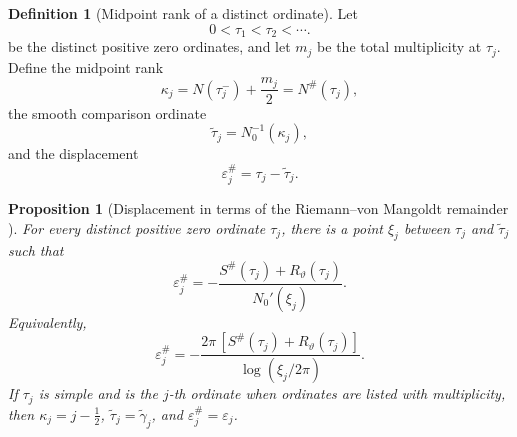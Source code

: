 \documentclass[11pt]{amsart}
\numberwithin{equation}{section}
\theoremstyle{plain}
\newtheorem{proposition}[theorem]{Proposition}
\theoremstyle{definition}
\newtheorem{definition}[theorem]{Definition}
\theoremstyle{remark}
\newcommand{\1}{\mathbf{1}}
\begin{document}
\begin{definition}[Midpoint rank of a distinct ordinate]
\label{def:midpoint_rank_distinct_ordinate}
Let
\begin{equation}
0<\tau_1<\tau_2<\cdots.
\label{eq:distinct_ordinate_order}
\end{equation}
be the distinct positive zero ordinates, and let \(m_j\) be the total
multiplicity at \(\tau_j\).  Define the midpoint rank
\begin{equation}
\kappa_j
=
N(\tau_j^-)+\frac{m_j}{2}
=
N^{\#}(\tau_j),
\label{eq:midpoint_rank_distinct_ordinate}
\end{equation}
the smooth comparison ordinate
\begin{equation}
\widetilde\tau_j
=
N_0^{-1}(\kappa_j),
\label{eq:smooth_distinct_ordinate}
\end{equation}
and the displacement
\begin{equation}
\varepsilon_j^{\#}
=
\tau_j-\widetilde\tau_j.
\label{eq:distinct_ordinate_displacement}
\end{equation}
\end{definition}


\begin{proposition}[Displacement in terms of the Riemann--von Mangoldt remainder {}]
\label{prop:displacement_rvm_remainder}
For every distinct positive zero ordinate \(\tau_j\), there is a point
\(\xi_j\) between \(\tau_j\) and \(\widetilde\tau_j\) such that
\begin{equation}
\boxed{
\varepsilon_j^{\#}
=
-
\frac{S^{\#}(\tau_j)+R_\vartheta(\tau_j)}
{N_0'(\xi_j)}.
}
\label{eq:displacement_rvm_formula}
\end{equation}
Equivalently,
\begin{equation}
\varepsilon_j^{\#}
=
-
\frac{2\pi\,[S^{\#}(\tau_j)+R_\vartheta(\tau_j)]}
{\log(\xi_j/2\pi)}.
\label{eq:displacement_rvm_explicit}
\end{equation}
If \(\tau_j\) is simple and is the \(j\)-th ordinate when ordinates are
listed with multiplicity, then
\(\kappa_j=j-\tfrac12\),
\(\widetilde\tau_j=\widetilde\gamma_j\), and
\(\varepsilon_j^{\#}=\varepsilon_j\).
\end{proposition}
\end{document}
